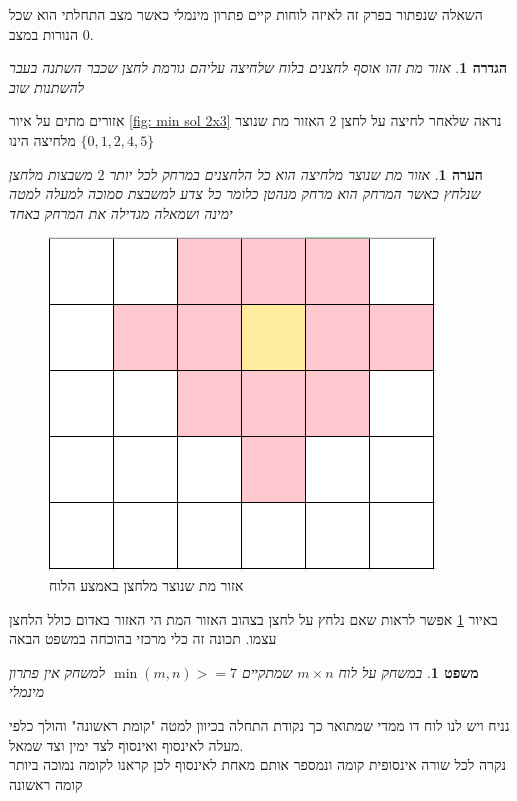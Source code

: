 \documentclass[12pt,twoside]{article}
\newtheorem{definition}{הגדרה}[section]
\newtheorem{theorem}{משפט}[section]
\newtheorem{comm}{הערה}[section]
\begin{document}
השאלה שנפתור בפרק זה לאיזה לוחות קיים פתרון מינמלי כאשר מצב התחלתי הוא שכל הנורות במצב
$0$.

\begin{definition}
    \label{def: dead zone}
    אזור מת זהו אוסף לחצנים בלוח
    שלחיצה עליהם 
    גורמת לחצן שכבר השתנה בעבר להשתנות שוב
\end{definition}

אזורים מתים על איור 
\ref{fig: min sol 2x3}
נראה שלאחר לחיצה על
לחצן
$2$
האזור מת שנוצר מלחיצה הינו
$\{0,1,2,4,5\}$

\begin{comm}
    אזור מת שנוצר מלחיצה 
    הוא כל הלחצנים במרחק לכל יותר 
    $2$
    משבצות מלחצן שנלחץ
    כאשר המרחק הוא מרחק מנהטן כלומר כל צדע למשבצת סמוכה למעלה למטה ימינה ושמאלה מגדילה את המרחק באחד
\end{comm}

\begin{figure}[ht]
    \caption{אזור מת שנוצר מלחצן באמצע הלוח}
    \label{fig: dead zone}
    \centering
    \includegraphics[width=.7\textwidth,height=.7\textheight,keepaspectratio]{images/dead_zone.PNG}
\end{figure}

באיור 
\ref{fig: dead zone}
אפשר לראות שאם נלחץ על לחצן בצהוב האזור המת הי האזור באדום כולל 
הלחצן עצמו.
תכונה זה כלי מרכזי בהוכחה במשפט הבאה

\begin{theorem}
    \label{thrm: bigger then 7x7 board no minimal solution}
    במשחק על לוח 
    $m \times n$
    שמתקיים
    $\min(m,n) >= 7$
    למשחק אין פתרון מינמלי
\end{theorem}

נניח ויש לנו לוח דו ממדי שמתואר כך נקודת התחלה בכיוון למטה 
"קומת ראשונה"
והולך כלפי מעלה לאינסוף 
ואינסוף לצד ימין וצד שמאל.
\\
נקרה לכל שורה אינסופית
קומה ונמספר אותם מאחת לאינסוף לכן קראנו לקומה נמוכה ביותר קומה ראשונה
\end{document}
